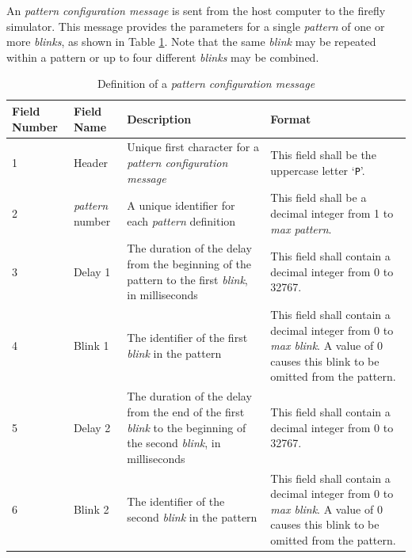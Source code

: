 \documentclass[letterpaper,11pt]{article}
\begin{document}
An \textit{pattern configuration message} is sent from the host computer to the
firefly simulator. This message provides the parameters for a single
\textit{pattern} of one or more \textit{blinks}, as shown in Table
\ref{tab:PatternConfig}. Note that the same \textit{blink} may be repeated
within a pattern or up to four different \textit{blinks} may be combined.

\begin{table}[H]
\centering
\caption{Definition of a \textit{pattern configuration message}}
\label{tab:PatternConfig}
\setlength\extrarowheight{2pt}
\begin{tabular}[h]{|p{0.5in}|p{1.00in}|p{2.25in}|p{2.25in}|} \hline
Field Number & Field Name & Description & Format \\ \hline
1            & Header
             & Unique first character for a \textit{pattern configuration
             message}
             & This field shall be the uppercase letter `\texttt{P}'.
             \\ \hline
2            & \textit{pattern} number
             & A unique identifier for each \textit{pattern} definition
             & This field shall be a decimal integer from 1 to \textit{max
             pattern}.
             \\ \hline
3            & Delay 1
             & The duration of the delay from the beginning of the pattern
               to the first \textit{blink}, in milliseconds
             & This field shall contain a decimal integer from 0 to 32767.
             \\ \hline
4            & Blink 1
             & The identifier of the first \textit{blink} in the pattern
             & This field shall contain a decimal integer from 0 to
             \textit{max blink}. A value of 0 causes this blink to be omitted
             from the pattern.
             \\ \hline
5            & Delay 2
             & The duration of the delay from the end of the first
               \textit{blink} to the beginning of the second \textit{blink},
               in milliseconds
             & This field shall contain a decimal integer from 0 to 32767.
             \\ \hline
6            & Blink 2
             & The identifier of the second \textit{blink} in the pattern
             & This field shall contain a decimal integer from 0 to
             \textit{max blink}. A value of 0 causes this blink to be omitted
             from the pattern.
             \\ \hline

\end{tabular}
\end{table}
\end{document}
